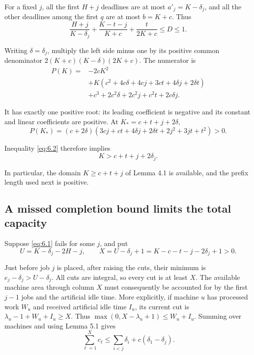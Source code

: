 \documentclass[11pt,a4paper]{article}
\begin{document}
For a fixed \(j\), all the first \(H+j\) deadlines are at most \(a'_j=K-\delta_j\), and all the other deadlines among the first \(q\) are at most \(b=K+c\). Thus
\begin{equation}
\frac{H+j}{K-\delta_j}
 +\frac{K-t-j}{K+c}+\frac t{2K+c}\le D\le1.
\tag{6.2}
\label{eq:6.2}
\end{equation}

Writing \(\delta=\delta_j\), multiply the left side minus one by its positive common denominator \(2(K+c)(K-\delta)(2K+c)\). The numerator is
\begin{equation}
\begin{aligned}
P(K)={}&-2cK^2\\
&+K(c^2+4c\delta+4cj+3ct+4\delta j+2\delta t)\\
&+c^3+2c^2\delta+2c^2j+c^2t+2c\delta j.
\end{aligned}
\tag{6.3}
\label{eq:6.3}
\end{equation}

It has exactly one positive root: its leading coefficient is negative and its constant and linear coefficients are positive. At \(K_*=c+t+j+2\delta\),
\begin{equation}
P(K_*)=(c+2\delta)
 (3cj+ct+4\delta j+2\delta t+2j^2+3jt+t^2)>0.
\tag{6.4}
\label{eq:6.4}
\end{equation}

Inequality \eqref{eq:6.2} therefore implies
\begin{equation}
K>c+t+j+2\delta_j.
\tag{6.5}
\label{eq:6.5}
\end{equation}

In particular, the domain \(K\ge c+t+j\) of Lemma 4.1 is available, and the prefix length used next is positive.

\hypertarget{a-missed-completion-bound-limits-the-total-capacity}{%
\subsection{A missed completion bound limits the total capacity}\label{a-missed-completion-bound-limits-the-total-capacity}}

Suppose \eqref{eq:6.1} fails for some \(j\), and put
\[
U=K-\delta_j-2H-j,
\qquad X=U-\delta_j+1
       =K-c-t-j-2\delta_j+1>0.
\]

Just before job \(j\) is placed, after raising the cuts, their minimum is \(e_j-\delta_j>U-\delta_j\). All cuts are integral, so every cut is at least \(X\). The available machine area through column \(X\) must consequently be accounted for by the first \(j-1\) jobs and the artificial idle time. More explicitly, if machine \(u\) has processed work \(W_u\) and received artificial idle time \(I_u\), its current cut is \(\lambda_u-1+W_u+I_u\ge X\). Thus \(\max(0,X-\lambda_u+1)\le W_u+I_u\). Summing over machines and using Lemma 5.1 gives
\begin{equation}
\sum_{\ell=1}^X c_\ell
\le\sum_{i<j}\delta_i+c(\delta_1-\delta_j).
\tag{6.6}
\label{eq:6.6}
\end{equation}
\end{document}

